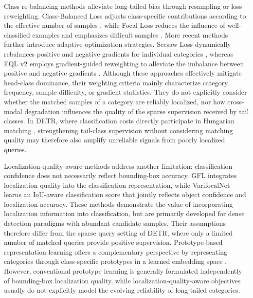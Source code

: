 \documentclass[letterpaper,journal]{IEEEtran}
\begin{document}
Class re-balancing methods alleviate long-tailed bias through resampling or loss reweighting. Class-Balanced Loss adjusts class-specific contributions according to the effective number of samples \cite{class_balanced_loss}, while Focal Loss reduces the influence of well-classified examples and emphasizes difficult samples \cite{focal_loss}. More recent methods further introduce adaptive optimization strategies. Seesaw Loss dynamically rebalances positive and negative gradients for individual categories \cite{seesaw}, whereas EQL v2 employs gradient-guided reweighting to alleviate the imbalance between positive and negative gradients \cite{eqlv2}. Although these approaches effectively mitigate head-class dominance, their weighting criteria mainly characterize category frequency, sample difficulty, or gradient statistics. They do not explicitly consider whether the matched samples of a category are reliably localized, nor how cross-modal degradation influences the quality of the sparse supervision received by tail classes. In DETR, where classification costs directly participate in Hungarian matching \cite{detr}, strengthening tail-class supervision without considering matching quality may therefore also amplify unreliable signals from poorly localized queries.

Localization-quality-aware methods address another limitation: classification confidence does not necessarily reflect bounding-box accuracy. GFL \cite{gfl} integrates localization quality into the classification representation, while VarifocalNet \cite{varifocalnet} learns an IoU-aware classification score that jointly reflects object confidence and localization accuracy. These methods demonstrate the value of incorporating localization information into classification, but are primarily developed for dense detection paradigms with abundant candidate samples. Their assumptions therefore differ from the sparse query setting of DETR, where only a limited number of matched queries provide positive supervision. Prototype-based representation learning offers a complementary perspective by representing categories through class-specific prototypes in a learned embedding space \cite{protonet}. However, conventional prototype learning is generally formulated independently of bounding-box localization quality, while localization-quality-aware objectives usually do not explicitly model the evolving reliability of long-tailed categories.
\end{document}
